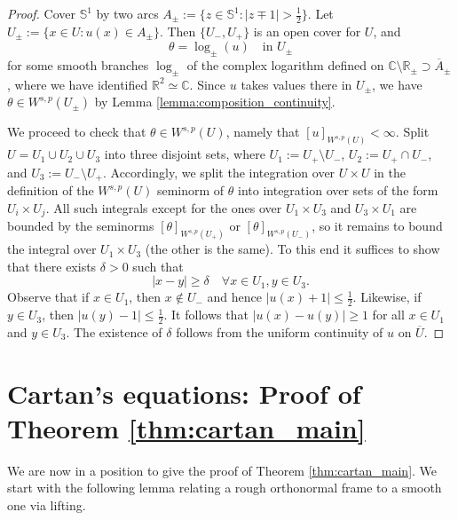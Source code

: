 \documentclass[12pt]{article}
\newcommand{\R}{\mathbb{R}}
\theoremstyle{plain}
\numberwithin{equation}{section}
\begin{document}
\begin{proof}
    Cover $\mathbb{S}^1$ by two arcs $A_{\pm} := \{z \in \mathbb{S}^1 : |z\mp1|> \frac12\}$. Let $U_\pm := \{x \in U : u(x) \in A_\pm\}$. Then $\{U_-, U_+\}$ is an open cover for $U$, and
    \begin{equation*}
        \theta = \log_\pm(u) \quad \text{in } U_\pm
    \end{equation*}
    for some smooth branches $\log_\pm$ of the complex logarithm defined on $\mathbb{C}\setminus \R_\pm \supset \overline{A}_\pm$, where we have identified $\R^2 \simeq \mathbb{C}$. Since $u$ takes values there in $U_\pm$, we have $\theta \in W^{s,p}(U_\pm)$ by Lemma \ref{lemma:composition_continuity}. 
    
    We proceed to check that $\theta \in W^{s,p}(U)$, namely that $[u]_{W^{s,p}(U)} < \infty$. Split $U = U_1 \cup U_2 \cup U_3$ into three disjoint sets, where $U_1 := U_+ \setminus U_-$, $U_2 := U_+ \cap U_-$, and $U_3 := U_- \setminus U_+$. Accordingly, we split the integration over $U \times U$ in the definition of the $W^{s,p}(U)$ seminorm of $\theta$ into integration over sets of the form $U_i \times U_j$. All such integrals except for the ones over $U_1 \times U_3$ and $U_3 \times U_1$ are bounded by the seminorms $[\theta]_{W^{s,p}(U_+)}$ or $[\theta]_{W^{s,p}(U_-)}$, so it remains to bound the integral over $U_1 \times U_3$ (the other is the same). To this end it suffices to show that there exists $\delta > 0$ such that
    \begin{equation*}
    |x-y| \geq \delta \quad \forall x \in U_1, y\in U_3.
    \end{equation*}
    Observe that if $x \in U_1$, then $x \notin U_-$ and hence $|u(x)+1| \leq \frac12$. Likewise, if $y \in U_3$, then $|u(y) - 1| \leq \frac12$. It follows that $|u(x)-u(y)| \geq 1$ for all $x \in U_1$ and $y \in U_3$. The existence of $\delta$ follows from the uniform continuity of $u$ on $\overline U$.
\end{proof}

\section{Cartan's equations: Proof of Theorem \ref{thm:cartan_main}} \label{sec:proof_cartan}

We are now in a position to give the proof of Theorem \ref{thm:cartan_main}. We start with the following lemma relating a rough orthonormal frame to a smooth one via lifting.
\end{document}
